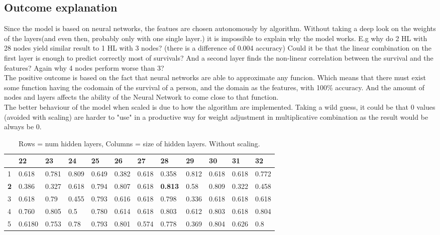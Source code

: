 \documentclass{article}
\begin{document}
\subsection{Outcome explanation}
Since the model is based on neural networks, the featues are chosen autonomously by algorithm. Without taking a deep look on the weights of the layers(and even then, probably only with one single layer.) it is impossible to explain why the model works. 
E.g why do 2 HL with 28 nodes yield similar result to 1 HL with 3 nodes? (there is a difference of 0.004 accuracy) Could it be that the linear combination on the first layer is enough to predict correctly most of survivals? And a second layer finds the non-linear correlation between the survival and the features? Again why 4 nodes perform worse than 3? \\
The positive outcome is based on the fact that neural networks are able to approximate any funcion. Which means that there must exist some function having the codomain of the survival of a person, and the domain as the features, with 100\% accuracy. And the amount of nodes and layers affects the ability of the Neural Network to come close to that function.\\
The better behaviour of the model when scaled is due to how the algorithm are implemented. Taking a wild guess, it could be that 0 values (avoided with scaling) are harder to "use" in a productive way for weight adjustment in multiplicative combination as the result would be always be 0.

\begin{table}[]
\caption{Rows = num hidden layers, Columns = size of hidden layers. Without scaling.}
\centering
\label{tab:sklearn-NoScaling}
\begin{tabular}{|l|l|l|l|l|l|l|l|l|l|l|l|}
\hline
           & 22       & 23       & 24       & 25       & 26       & 27       & \textbf{28}       & 29       & 30       & 31       & 32       \\ \hline
1          & 0.618 & 0.781 & 0.809 & 0.649 & 0.382 & 0.618 & 0.358          & 0.812 & 0.618 & 0.618 & 0.772 \\ \hline
\textbf{2} & 0.386 & 0.327 & 0.618 & 0.794 & 0.807 & 0.618 & \textbf{0.813} & 0.58 & 0.809 & 0.322 & 0.458 \\ \hline
3          & 0.618 & 0.79 & 0.455 & 0.793 & 0.616 & 0.618 & 0.798          & 0.336 & 0.618 & 0.618 & 0.618 \\ \hline
4          & 0.760 & 0.805 & 0.5 & 0.780 & 0.614 & 0.618 & 0.803          & 0.612 & 0.803 & 0.618 & 0.804 \\ \hline
5          & 0.6180 & 0.753 & 0.78 & 0.793 & 0.801 & 0.574 & 0.778          & 0.369 & 0.804 & 0.626 & 0.8 \\ \hline
\end{tabular}

\end{table}
\end{document}

